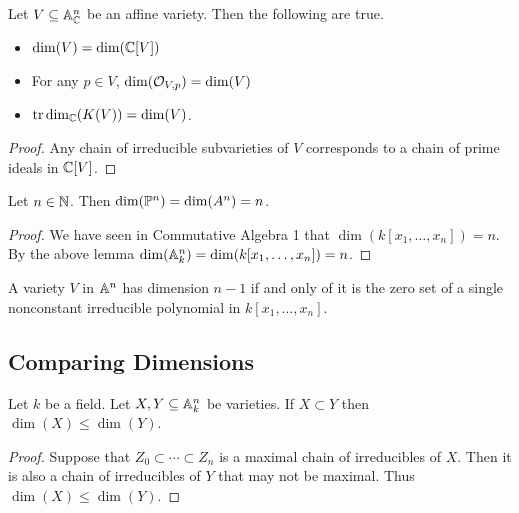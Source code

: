 \documentclass[a4paper]{article}
\begin{document}
\begin{prp}{}{} Let $V\subseteq\mathbb{A}_{\mathbb{C}}^n$ be an affine variety. Then the following are true. 
\begin{itemize}
\item $\dim(V)=\dim(\mathbb{C}[V])$
\item For any $p\in V$, $\dim(\mathcal{O}_{V,p})=\dim(V)$
\item $\text{tr}\dim_{\mathbb{C}}(K(V))=\dim(V)$. 
\end{itemize} \tcbline
\begin{proof}
Any chain of irreducible subvarieties of $V$ corresponds to a chain of prime ideals in $\mathbb{C}[V]$. 
\end{proof}
\end{prp}

\begin{lmm}{}{} Let $n\in\mathbb{N}$. Then $\dim(\mathbb{P}^n)=\dim(A^n)=n$. \tcbline
\begin{proof}
We have seen in Commutative Algebra 1 that $\dim(k[x_1,\dots,x_n])=n$. By the above lemma $\dim(\mathbb{A}_k^n)=\dim(k[x_1,\dots,x_n])=n$. 
\end{proof}
\end{lmm}

\begin{prp}{}{} A variety $V$ in $\mathbb{A}^n$ has dimension $n-1$ if and only of it is the zero set of a single nonconstant irreducible polynomial in $k[x_1,\dots,x_n]$. 
\end{prp}

\subsection{Comparing Dimensions}
\begin{lmm}{}{} Let $k$ be a field. Let $X,Y\subseteq\mathbb{A}_k^n$ be varieties. If $X\subset Y$ then $\dim(X)\leq\dim(Y)$. \tcbline
\begin{proof}
Suppose that $Z_0\subset\cdots\subset Z_n$ is a maximal chain of irreducibles of $X$. Then it is also a chain of irreducibles of $Y$ that may not be maximal. Thus $\dim(X)\leq\dim(Y)$. 
\end{proof}
\end{lmm}
\end{document}

